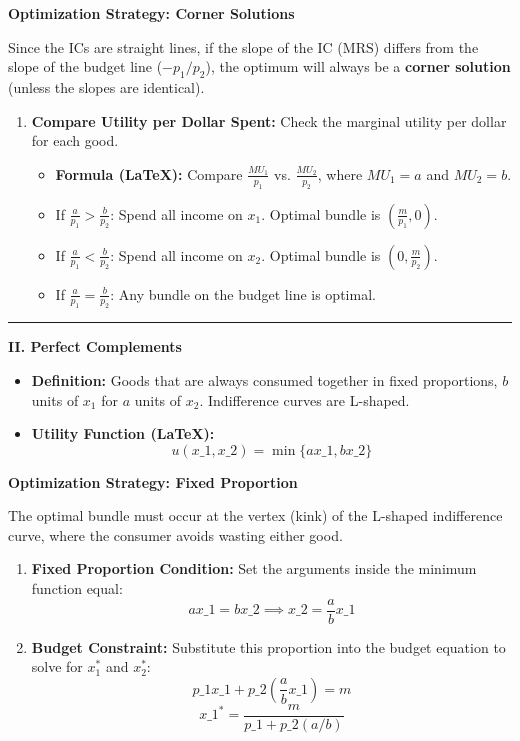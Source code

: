 \documentclass{article}
\begin{document}
\noindent\textbf{Optimization Strategy: Corner Solutions}

Since the ICs are straight lines, if the slope of the IC ($\text{MRS}$) differs from the slope of the budget line ($-p_1/p_2$), the optimum will always be a \textbf{corner solution} (unless the slopes are identical).

\begin{enumerate}
    \item \textbf{Compare Utility per Dollar Spent:} Check the marginal utility per dollar for each good.
    \begin{itemize}
        \item \textbf{Formula (LaTeX):} Compare $\frac{MU_1}{p_1}$ vs. $\frac{MU_2}{p_2}$, where $MU_1=a$ and $MU_2=b$.
        \item If $\frac{a}{p_1} > \frac{b}{p_2}$: Spend all income on $x_1$. Optimal bundle is $\left(\frac{m}{p_1}, 0\right)$.
        \item If $\frac{a}{p_1} < \frac{b}{p_2}$: Spend all income on $x_2$. Optimal bundle is $\left(0, \frac{m}{p_2}\right)$.
        \item If $\frac{a}{p_1} = \frac{b}{p_2}$: Any bundle on the budget line is optimal.
    \end{itemize}
\end{enumerate}

\medskip\noindent\rule{\linewidth}{0.4pt}\medskip

\noindent\textbf{II. Perfect Complements}
\begin{itemize}
    \item \textbf{Definition:} Goods that are always consumed together in fixed proportions, $b$ units of $x_1$ for $a$ units of $x_2$. Indifference curves are L-shaped.
    \item \textbf{Utility Function (LaTeX):} \[u(x\_1, x\_2) = \min\{a x\_1, b x\_2\}\]
\end{itemize}

\noindent\textbf{Optimization Strategy: Fixed Proportion}

The optimal bundle must occur at the vertex (kink) of the L-shaped indifference curve, where the consumer avoids wasting either good.

\begin{enumerate}
    \item \textbf{Fixed Proportion Condition:} Set the arguments inside the minimum function equal: \[a x\_1 = b x\_2 \implies x\_2 = \frac{a}{b} x\_1\]
    \item \textbf{Budget Constraint:} Substitute this proportion into the budget equation to solve for $x_1^*$ and $x_2^*$: \[p\_1 x\_1 + p\_2 \left(\frac{a}{b} x\_1\right) = m\] \[x\_1^* = \frac{m}{p\_1 + p\_2(a/b)}\]
\end{enumerate}
\end{document}
